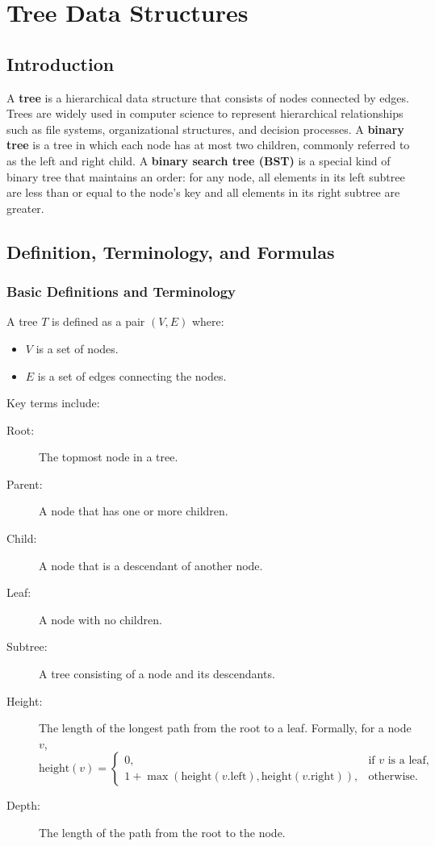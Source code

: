\chapter{Tree Data Structures}

\section{Introduction}
A \textbf{tree} is a hierarchical data structure that consists of nodes connected by edges. Trees are widely used in computer science to represent hierarchical relationships such as file systems, organizational structures, and decision processes. A \textbf{binary tree} is a tree in which each node has at most two children, commonly referred to as the left and right child. A \textbf{binary search tree (BST)} is a special kind of binary tree that maintains an order: for any node, all elements in its left subtree are less than or equal to the node's key and all elements in its right subtree are greater.

\section{Definition, Terminology, and Formulas}
\subsection{Basic Definitions and Terminology}
A tree \( T \) is defined as a pair \( (V, E) \) where:
\begin{itemize}
    \item \( V \) is a set of nodes.
    \item \( E \) is a set of edges connecting the nodes.
\end{itemize}
Key terms include:
\begin{description}
    \item[Root:] The topmost node in a tree.
    \item[Parent:] A node that has one or more children.
    \item[Child:] A node that is a descendant of another node.
    \item[Leaf:] A node with no children.
    \item[Subtree:] A tree consisting of a node and its descendants.
    \item[Height:] The length of the longest path from the root to a leaf. Formally, for a node \( v \), 
    \[
    \text{height}(v) = \begin{cases} 
    0, & \text{if } v \text{ is a leaf,} \\
    1 + \max(\text{height}(v.\text{left}), \text{height}(v.\text{right})), & \text{otherwise.}
    \end{cases}
    \]
    \item[Depth:] The length of the path from the root to the node.
\end{description}

